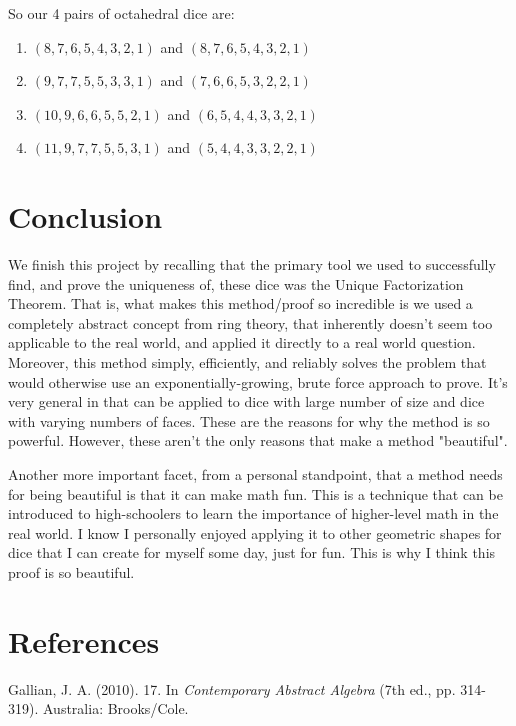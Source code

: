 \documentclass[12pt]{report}
\begin{document}
So our 4 pairs of octahedral dice are:
\begin{enumerate}
\item $(8,7,6,5,4,3,2,1)$ and $(8,7,6,5,4,3,2,1)$
\item $(9,7,7,5,5,3,3,1)$ and $(7,6,6,5,3,2,2,1)$
\item $(10,9,6,6,5,5,2,1)$ and $(6,5,4,4,3,3,2,1)$
\item $(11,9,7,7,5,5,3,1)$ and $(5,4,4,3,3,2,2,1)$
\end{enumerate}

\section*{Conclusion}
We finish this project by recalling that the primary tool we used to successfully find, and prove the uniqueness of, these dice was the Unique Factorization Theorem. That is, what makes this method/proof so incredible is we used a completely abstract concept from ring theory, that inherently doesn't seem too applicable to the real world, and applied it directly to a real world question. Moreover, this method simply, efficiently, and reliably solves the problem that would otherwise use an exponentially-growing, brute force approach to prove. It's very general in that can be applied to dice with large number of size and dice with varying numbers of faces. These are the reasons for why the method is so powerful. However, these aren't the only reasons that make a method "beautiful".

Another more important facet, from a personal standpoint, that a method needs for being beautiful is that it can make math fun. This is a technique that can be introduced to high-schoolers to learn the importance of higher-level math in the real world. I know I personally enjoyed applying it to other geometric shapes for dice that I can create for myself some day, just for fun. This is why I think this proof is so beautiful.

\section*{References}
Gallian, J. A. (2010). 17. In \textit{Contemporary Abstract Algebra} (7th ed., pp. 314-319). Australia: Brooks/Cole.
\end{document}
